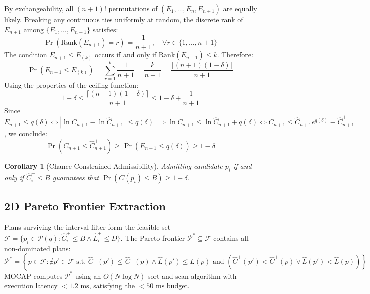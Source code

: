 \documentclass[journal,10pt,onecolumn]{article}
\newtheorem{corollary}[theorem]{Corollary}
\begin{document}
\begin{proofbox}
By exchangeability, all $(n+1)!$ permutations of $(E_1, \dots, E_n, E_{n+1})$ are equally likely. Breaking any continuous ties uniformly at random, the discrete rank of $E_{n+1}$ among $\{E_1, \dots, E_{n+1}\}$ satisfies:
\begin{equation}
    \Pr\left( \text{Rank}(E_{n+1}) = r \right) = \frac{1}{n+1}, \quad \forall r \in \{1, \dots, n+1\}
\end{equation}
The condition $E_{n+1} \le E_{(k)}$ occurs if and only if $\text{Rank}(E_{n+1}) \le k$. Therefore:
\begin{equation}
    \Pr\left( E_{n+1} \le E_{(k)} \right) = \sum_{r=1}^k \frac{1}{n+1} = \frac{k}{n+1} = \frac{\lceil(n+1)(1-\delta)\rceil}{n+1}
\end{equation}
Using the properties of the ceiling function:
\begin{equation}
    1 - \delta \le \frac{\lceil(n+1)(1-\delta)\rceil}{n+1} \le 1 - \delta + \frac{1}{n+1}
\end{equation}
Since $E_{n+1} \le q(\delta) \iff |\ln C_{n+1} - \ln \hat{C}_{n+1}| \le q(\delta) \implies \ln C_{n+1} \le \ln \hat{C}_{n+1} + q(\delta) \iff C_{n+1} \le \hat{C}_{n+1} e^{q(\delta)} \equiv \hat{C}_{n+1}^+$, we conclude:
\begin{equation}
    \Pr\left( C_{n+1} \le \hat{C}_{n+1}^+ \right) \ge \Pr\left( E_{n+1} \le q(\delta) \right) \ge 1 - \delta
\end{equation}
\end{proofbox}

\begin{corollary}[Chance-Constrained Admissibility]
Admitting candidate $p_i$ if and only if $\hat{C}_i^+ \le B$ guarantees that $\Pr(C(p_i) \le B) \ge 1 - \delta$.
\end{corollary}

\subsection{2D Pareto Frontier Extraction}
Plans surviving the interval filter form the feasible set $\mathcal{F} = \{p_i \in \mathcal{P}(q) : \hat{C}_i^+ \le B \land \hat{L}_i^+ \le D\}$.
The Pareto frontier $\mathcal{P}^* \subseteq \mathcal{F}$ contains all non-dominated plans:
\begin{equation}
    \mathcal{P}^* = \left\{ p \in \mathcal{F} : \nexists p' \in \mathcal{F} \text{ s.t. } \hat{C}^+(p') \le \hat{C}^+(p) \land \hat{L}(p') \le \hat{L}(p) \text{ and } (\hat{C}^+(p') < \hat{C}^+(p) \lor \hat{L}(p') < \hat{L}(p)) \right\}
\end{equation}
MOCAP computes $\mathcal{P}^*$ using an $O(N \log N)$ sort-and-scan algorithm with execution latency $< 1.2\text{ ms}$, satisfying the $< 50\text{ ms}$ budget.
\end{document}
